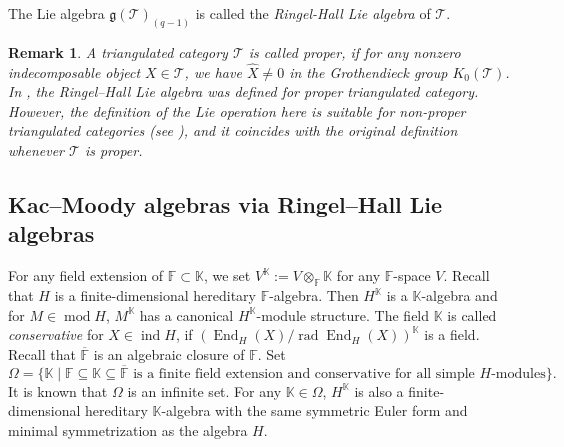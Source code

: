 \documentclass[12pt,reqno]{amsart}
\numberwithin{equation}{section}
\renewcommand{\mod}{\operatorname{mod}\nolimits}
\newcommand{\rad}{\operatorname{rad}\nolimits}
\newcommand{\End}{\operatorname{End}\nolimits}
\def \ov{\overline}
\newcommand{\go}{{K_0}}
\newtheorem{remark}[theorem]{Remark}
\begin{document}
	The Lie algebra $\mathfrak{g}(\mathcal{T})_{(q-1)}$ is called the {\em Ringel-Hall Lie algebra} of $\mathcal{T}$.
	\begin{remark}
		A triangulated category $\mathcal{T}$ is called {\em proper}, if for any nonzero indecomposable object $X\in \mathcal{T}$, we have $\hat{X}\ne 0$ in the Grothendieck group $\go(\mathcal{T})$. In  \cite{PX00-Tri-Cat-Kac}, the Ringel--Hall Lie algebra was defined for proper triangulated category. However, the definition of the Lie operation here is suitable for non-proper triangulated categories (see \cite{X06-der-cat-Lie-alg}), and it coincides with the original definition whenever $\mathcal{T}$ is proper.  
	\end{remark}
	
	\subsection{Kac--Moody algebras via Ringel--Hall Lie algebras}\label{ss:intergral-R-H-Lie-alg}
	
	
	
	
	For any field extension of $\mathbb{F}\subset \mathbb{K}$, we set $V^\mathbb{K}:=V\otimes_\mathbb{F} \mathbb{K}$ for any $\mathbb{F}$-space $V$. Recall that $H$ is a finite-dimensional hereditary $\mathbb{F}$-algebra. Then $H^\mathbb{K}$ is a $\mathbb{K}$-algebra and for $M\in \mod H$, $M^\mathbb{K}$ has a canonical $H^\mathbb{K}$-module structure. The field $\mathbb{K}$ is called
	{\em conservative} for $X\in \operatorname{ind} H$, if $(\End_H(X)/\rad\End_H(X))^\mathbb{K}$ is a field. Recall that  $\ov{\mathbb{F}}$ is an algebraic closure of $\mathbb{F}$.
	Set
	\[
	\Omega=\{\mathbb{K}\mid\mathbb{F}\subseteq \mathbb{K}\subseteq \ov{\mathbb{F}}\,\, \text{is a finite field extension and conservative for all simple $H$-modules}\}.
	\]
	It is known that $\Omega$ is an infinite set. For any $\mathbb{K}\in\Omega$,  $H^\mathbb{K}$ is also a finite-dimensional hereditary $\mathbb{K}$-algebra with the same symmetric Euler form and minimal symmetrization as the algebra $H$.
	
\end{document}
